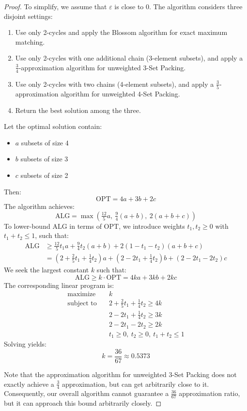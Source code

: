 \begin{proof}
To simplify, we assume that $\varepsilon$ is close to $0$. The algorithm considers three disjoint settings:
\begin{enumerate}
    \item Use only 2-cycles and apply the Blossom algorithm for exact maximum matching.
    \item Use only 2-cycles with one additional chain (3-element subsets), and apply a $\frac{3}{4}$-approximation algorithm for unweighted 3-Set Packing.
    \item Use only 2-cycles with two chains (4-element subsets), and apply a $\frac{3}{5}$-approximation algorithm for unweighted 4-Set Packing.
    \item Return the best solution among the three.
\end{enumerate}

Let the optimal solution contain:
\begin{itemize}
    \item $a$ subsets of size 4
    \item $b$ subsets of size 3
    \item $c$ subsets of size 2
\end{itemize}
Then:
\[
\mathrm{OPT} = 4a + 3b + 2c
\]
The algorithm achieves:
\[
\mathrm{ALG} = \max\left(\tfrac{12}{5} a,\ \tfrac{9}{4}(a + b),\ 2(a + b + c)\right)
\]
To lower-bound $\mathrm{ALG}$ in terms of $\mathrm{OPT}$, we introduce weights $t_1, t_2 \ge 0$ with $t_1 + t_2 \le 1$, such that:
\[
\begin{aligned}
    \mathrm{ALG} &\ge \tfrac{12}{5} t_1 a + \tfrac{9}{4} t_2 (a + b) + 2(1 - t_1 - t_2)(a + b + c) \\
    &= \left(2 + \tfrac{2}{5} t_1 + \tfrac{1}{4} t_2\right) a
    + \left(2 - 2t_1 + \tfrac{1}{4} t_2\right) b
    + \left(2 - 2t_1 - 2t_2\right) c
\end{aligned}
\]
We seek the largest constant $k$ such that:
\[
\mathrm{ALG} \ge k \cdot \mathrm{OPT} = 4ka + 3kb + 2kc
\]
The corresponding linear program is:
\[
\begin{aligned}
\text{maximize} \quad & k \\
\text{subject to} \quad
& 2 + \tfrac{2}{5} t_1 + \tfrac{1}{4} t_2 \ge 4k \\
& 2 - 2t_1 + \tfrac{1}{4} t_2 \ge 3k \\
& 2 - 2t_1 - 2t_2 \ge 2k \\
& t_1 \ge 0,\ t_2 \ge 0,\ t_1 + t_2 \le 1
\end{aligned}
\]
Solving yields:
\[
\boxed{k = \frac{36}{67} \approx 0.5373}
\]

Note that the approximation algorithm for unweighted 3-Set Packing does not exactly achieve a $\frac{3}{4}$ approximation, but can get arbitrarily close to it. Consequently, our overall algorithm cannot guarantee a $\frac{36}{67}$ approximation ratio, but it can approach this bound arbitrarily closely.

\end{proof}

